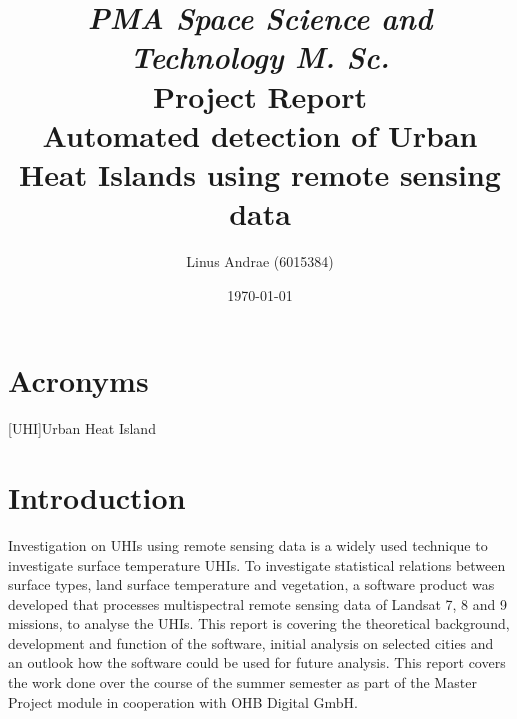 \documentclass[a4paper, english]{article}
\title{\textit{PMA Space Science and Technology M. Sc.} \\ \vspace{1cm}Project Report \\ \vspace{1cm} \textbf{\huge Automated detection of Urban Heat Islands using remote sensing data}\\ \vspace{1.2cm} }
\author{Linus Andrae (6015384)}
\date{\today}
\begin{document}

\newpage

\newpage
\tableofcontents
\listoffigures
\listoftables
\section*{Acronyms}
\begin{acronym}
  [UHI]{Urban Heat Island}
\end{acronym}
\newpage
\section{Introduction}
Investigation on \acfp{UHI} using remote sensing data is a widely used technique to investigate surface temperature \acp{UHI}. 
To investigate statistical relations between surface types, land surface temperature and vegetation, a software product was developed that processes multispectral remote sensing data of Landsat 7, 8 and 9 missions, to analyse the \acp{UHI}. 
This report is covering the theoretical background, development and function of the software, initial analysis on selected cities and an outlook how the software could be used for future analysis. 
This report covers the work done over the course of the summer semester as part of the Master Project module in cooperation with OHB Digital GmbH.


\newpage
\end{document}
